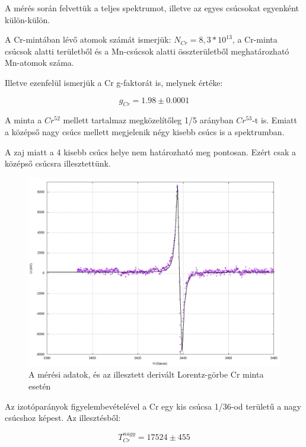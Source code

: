\documentclass[a4paper,12pt]{article}
\begin{document}
A mérés során felvettük a teljes spektrumot, illetve az egyes csúcsokat egyenként külön-külön.

A Cr-mintában lévő atomok számát ismerjük: $N_{Cr} = 8,3 * 10^{13}$, a Cr-minta csúcsok alatti területből és a Mn-csúcsok alatti összterületből meghatározható Mn-atomok száma.

Illetve ezenfelül ismerjük a Cr g-faktorát is, melynek értéke: 

\begin{equation}
g_{Cr}=1.98 \pm 0.0001
\end{equation} 

A minta a $Cr^{52}$ mellett tartalmaz megközelítőleg 1/5 arányban $Cr^{53}$-t is. Emiatt a középső nagy csúcs mellett megjelenik négy kisebb csúcs is a spektrumban.

A zaj miatt a 4 kisebb csúcs helye nem határozható meg pontosan. Ezért csak a középső csúcsra illesztettünk.

\begin{figure}[h!]
\includegraphics[width=15cm]{cr6.png}
\centering
\caption{A mérési adatok, és az illesztett derivált Lorentz-görbe Cr minta esetén}
\label{fig:4}
\end{figure}

Az izotóparányok figyelembevételével a Cr egy kis csúcsa 1/36-od területű a nagy csúcshoz képest. Az illesztésből: 

\begin{center}
\begin{equation}
T_{Cr}^{nagy}=17524 \pm 455
\end{equation}
\end{center}
\end{document}
